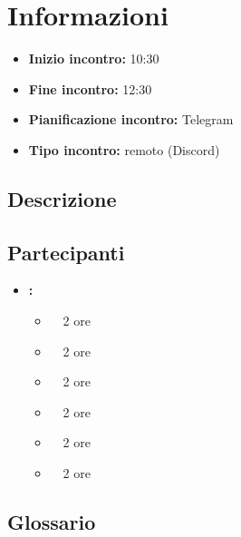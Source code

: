\section{Informazioni}
\begin{itemize}
	\item \textbf{Inizio incontro:} 10:30
	\item \textbf{Fine incontro:} 12:30
	\item \textbf{Pianificazione incontro:} Telegram
	\item \textbf{Tipo incontro:} remoto (Discord)
\end{itemize}

\subsection{Descrizione}
\DocDescription

\subsection{Partecipanti}

\begin{itemize}
	\item \textbf{\GroupName:}
	\begin{itemize}
		\item \tommaso \ \rightarrow\ 2 ore
		\item \marco \ \rightarrow\ 2 ore
		\item \riccardo \ \rightarrow\ 2 ore
		\item \raul \ \rightarrow\ 2 ore
		\item \martina \ \rightarrow\ 2 ore
		\item \sebastiano \ \rightarrow\ 2 ore
	\end{itemize}
\end{itemize}

\subsection{Glossario}
\GlossarioIntroduzione

\clearpage